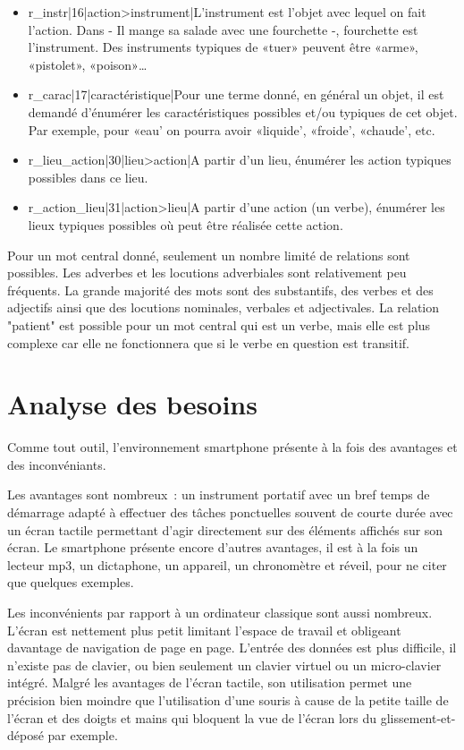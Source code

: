 \documentclass[a4paper,11pt,french]{article}
\begin{document}
\begin{itemize}
\item r\_instr|16|action>instrument|L'instrument est l'objet avec lequel on fait l'action. Dans - Il mange sa salade avec une fourchette -, fourchette est l'instrument. Des instruments typiques de «tuer» peuvent être «arme», «pistolet», «poison»\dots{}
\item r\_carac|17|caractéristique|Pour une terme donné, en général un objet, il est demandé d'énumérer les caractéristiques possibles et/ou typiques de cet objet. Par exemple, pour «eau' on pourra avoir «liquide', «froide', «chaude', etc.
\item r\_lieu\_action|30|lieu>action|A partir d'un lieu, énumérer les action typiques possibles dans ce lieu.
\item r\_action\_lieu|31|action>lieu|A partir d'une action (un verbe), énumérer les lieux typiques possibles où peut être réalisée cette action.
\end{itemize}

Pour un mot central donné, seulement un nombre limité de relations sont possibles. Les adverbes et les locutions adverbiales sont relativement peu fréquents. La grande majorité des mots sont des substantifs, des verbes et des adjectifs ainsi que des locutions nominales, verbales et adjectivales. La relation "patient" est possible pour un mot central qui est un verbe, mais elle est plus complexe car elle ne fonctionnera que si le verbe en question est transitif. 

\pagebreak

\section{Analyse des besoins}

Comme tout outil, l'environnement smartphone présente à la fois des avantages et des inconvéniants. 

Les avantages sont nombreux~: un instrument portatif avec un bref temps de démarrage adapté à effectuer des tâches ponctuelles souvent de courte durée avec un écran tactile permettant d'agir directement sur des éléments affichés sur son écran. Le smartphone présente encore d'autres avantages, il est à la fois un lecteur mp3, un dictaphone, un appareil, un chronomètre et réveil, pour ne citer que quelques exemples.

Les inconvénients par rapport à un ordinateur classique sont aussi nombreux. L'écran est nettement plus petit limitant l'espace de travail
et obligeant davantage de navigation de page en page. L'entrée des données est plus difficile, il n'existe pas de clavier, ou bien seulement
un clavier virtuel ou un micro-clavier intégré. Malgré les avantages de l'écran tactile, son utilisation permet une précision bien moindre
que l'utilisation d'une souris à cause de la petite taille de l'écran et des doigts et mains qui bloquent la vue de l'écran lors du
glissement-et-déposé par exemple.
\end{document}
